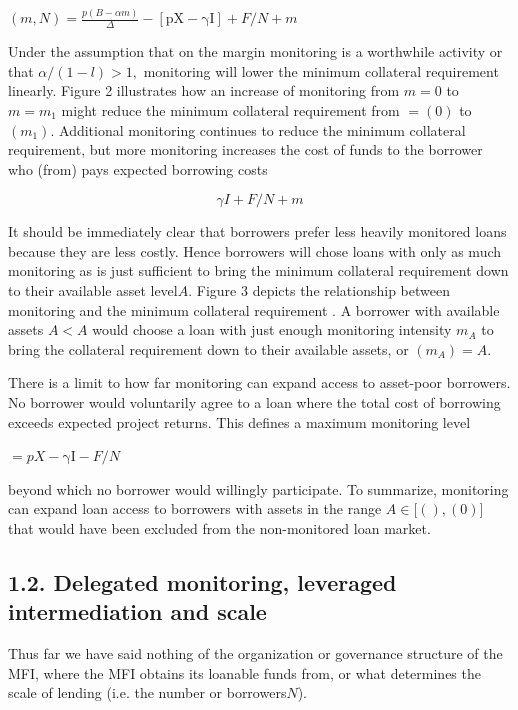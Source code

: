 \documentclass[
]{article}
\begin{document}
\((m,N) = \frac{p(B - \alpha m)}{\Delta} - \left\lbrack \text{pX} - \text{γI} \right\rbrack + F/N + m\)

Under the assumption that on the margin monitoring is a worthwhile
activity or that \(\alpha/(1 - l) > 1,\) monitoring will lower the
minimum collateral requirement linearly. Figure 2 illustrates how an
increase of monitoring from \(m = 0\) to \(m = m_{1}\) might reduce the
minimum collateral requirement from \(= (0)\) to \((m_{1}).\) Additional
monitoring continues to reduce the minimum collateral requirement, but
more monitoring increases the cost of funds to the borrower who (from)
pays expected borrowing costs

\[\gamma I + F/N + m\]

It should be immediately clear that borrowers prefer less heavily
monitored loans because they are less costly. Hence borrowers will chose
loans with only as much monitoring as is just sufficient to bring the
minimum collateral requirement down to their available asset level\(A\).
Figure 3 depicts the relationship between monitoring and the minimum
collateral requirement . A borrower with available assets \(A < A\)
would choose a loan with just enough monitoring intensity \(m_{A}\) to
bring the collateral requirement down to their available assets, or
\((m_{A}) = A.\)

There is a limit to how far monitoring can expand access to asset-poor
borrowers. No borrower would voluntarily agree to a loan where the total
cost of borrowing exceeds expected project returns. This defines a
maximum monitoring level

\(= pX - \text{γI} - F/N\)

beyond which no borrower would willingly participate\(.\) To summarize,
monitoring can expand loan access to borrowers with assets in the range
\(A \in \lbrack(),(0)\rbrack\) that would have been excluded from the
non-monitored loan market.

\hypertarget{delegated-monitoring-leveraged-intermediation-and-scale}{%
\subsection{1.2. Delegated monitoring, leveraged intermediation and
scale}\label{delegated-monitoring-leveraged-intermediation-and-scale}}

Thus far we have said nothing of the organization or governance
structure of the MFI, where the MFI obtains its loanable funds from, or
what determines the scale of lending (i.e. the number or
borrowers\(N\)).
\end{document}
